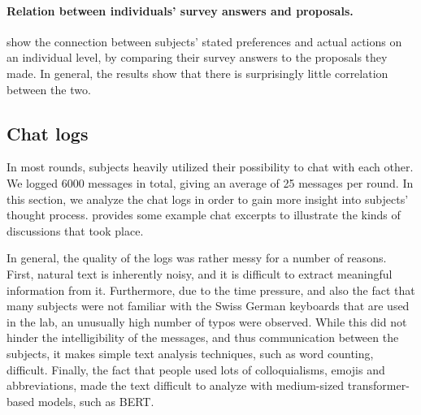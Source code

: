 \documentclass[12pt]{article}
\begin{document}
\paragraph{Relation between individuals' survey answers and proposals.}  show the connection between subjects' stated preferences and actual actions on an individual level, by comparing their survey answers to the proposals they made. In general, the results show that there is surprisingly little correlation between the two. 

\subsection{Chat logs} \label{sec:chat}

In most rounds, subjects heavily utilized their possibility to chat with each other. We logged 6000 messages in total, giving an average of 25 messages per round. In this section, we analyze the chat logs in order to gain more insight into subjects' thought process.  provides some example chat excerpts to illustrate the kinds of discussions that took place.

In general, the quality of the logs was rather messy for a number of reasons. First, natural text is inherently noisy, and it is difficult to extract meaningful information from it. Furthermore, due to the time pressure, and also the fact that many subjects were not familiar with the Swiss German keyboards that are used in the lab, an unusually high number of typos were observed. While this did not hinder the intelligibility of the messages, and thus communication between the subjects, it makes simple text analysis techniques, such as word counting, difficult. Finally, the fact that people used lots of colloquialisms, emojis and abbreviations, made the text difficult to analyze with medium-sized transformer-based models, such as BERT.
\end{document}
